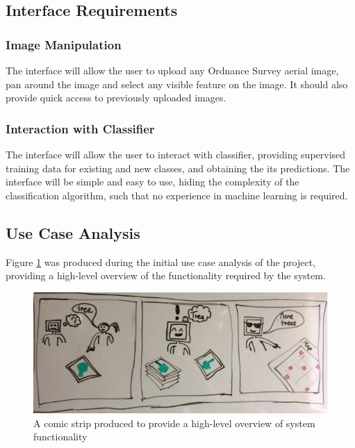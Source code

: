 \subsection{Interface Requirements} \label{intreqs}
\subsubsection{Image Manipulation}
The interface will allow the user to upload any Ordnance Survey aerial image, pan around the image and select any visible feature on the image. It should also provide quick access to previously uploaded images. 
\subsubsection{Interaction with Classifier}
The interface will allow the user to interact with classifier, providing supervised training data for existing and new classes, and obtaining the its predictions. The interface will be simple and easy to use, hiding the complexity of the classification algorithm, such that no experience in machine learning is required.
\subsection{Use Case Analysis}
Figure \ref{fig:comic} was produced during the initial use case analysis of the project, providing a high-level overview of the functionality required by the system.
\begin{figure}[H]
    \centering
    \includegraphics[width=\textwidth]{figs/4/comic}
    \caption{A comic strip produced to provide a high-level overview of system functionality}
    \label{fig:comic}
\end{figure}

